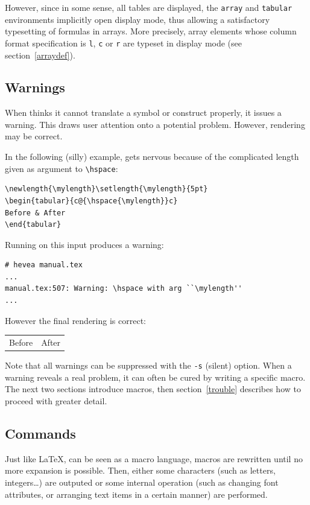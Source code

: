 However, since in some sense, all \html{} tables are displayed, the
\verb+array+ and \verb+tabular+ environments implicitly open display
mode, thus allowing a satisfactory typesetting of formulas in
arrays. More precisely, array elements whose column format
specification is \verb+l+, \verb+c+ or \verb+r+ are typeset in display
mode (see section~\ref{arraydef}).


\subsection{Warnings}
When \hevea{} thinks it cannot translate a symbol or construct
properly, it issues a warning. This draws user attention onto a
potential problem. However, rendering may be correct.

\begin{htmlonly}
In the following (silly) example, \hevea{} gets nervous  because of
the complicated length given as argument to \verb+\hspace+:
\begin{verbatim}
\newlength{\mylength}\setlength{\mylength}{5pt}
\begin{tabular}{c@{\hspace{\mylength}}c}
Before & After
\end{tabular}
\end{verbatim}
Running \hevea{} on this input produces a warning:
\begin{verbatim}
# hevea manual.tex
...
manual.tex:507: Warning: \hspace with arg ``\mylength''
...
\end{verbatim}
However the final rendering is correct:
\begin{htmlout}
\newlength{\mylength}\setlength{\mylength}{5pt}
\begin{tabular}{c@{\hspace{\mylength}}c}
Before & After
\end{tabular}
\end{htmlout}
\end{htmlonly}

Note that all warnings can be suppressed with the \verb+-s+ (silent)
option.
When a warning reveals a real problem, it can often be cured by
writing a specific macro. The next two sections introduce \hevea{}
macros, then section~\ref{trouble} describes how to proceed with
greater detail.

\subsection{Commands}
Just like \LaTeX{}, \hevea{} can be seen as a macro language, macros
are rewritten until no more expansion is possible. Then, either some
characters (such as letters, integers\ldots) are outputed or some
internal operation (such as changing font attributes, or arranging
text items in a certain manner) are performed.

